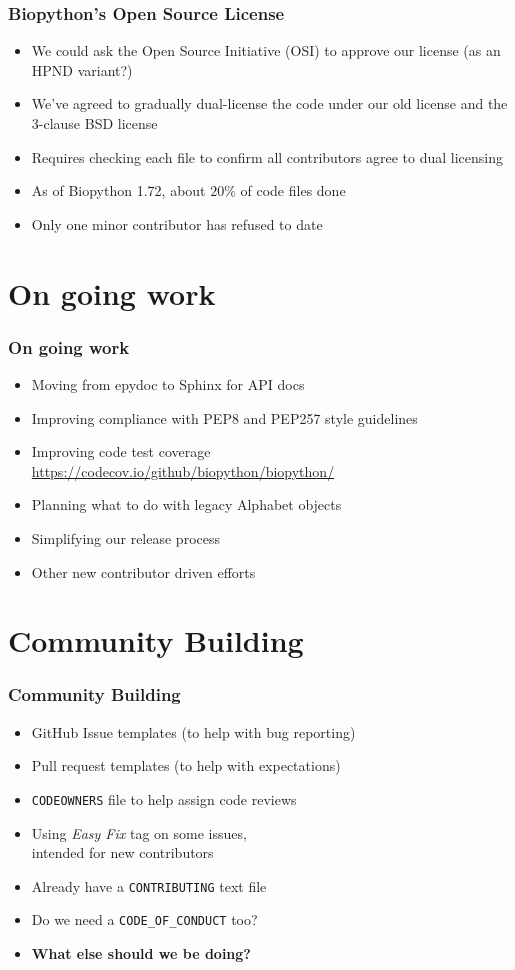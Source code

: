 \begin{frame}
\frametitle{Biopython's Open Source License}
\begin{itemize}
\item We could ask the Open Source Initiative (OSI)
    to approve our license (as an HPND variant?)
\item We've agreed to gradually dual-license the code
    under our old license and the 3-clause BSD license
\item Requires checking each file to confirm all
    contributors agree to dual licensing
\item As of Biopython 1.72, about $20\%$ of code files done
\item Only one minor contributor has refused to date
\end{itemize}
\end{frame}

\section{On going work}

\begin{frame}
\frametitle{On going work}
\begin{itemize}
    \item Moving from epydoc to Sphinx for API docs
    \item Improving compliance with PEP8 and PEP257 style guidelines
    \item Improving code test coverage \url{https://codecov.io/github/biopython/biopython/}
    \item Planning what to do with legacy Alphabet objects
    \item Simplifying our release process
    \item Other new contributor driven efforts
\end{itemize}
\end{frame}

\section{Community Building}

\begin{frame}
\frametitle{Community Building}
\begin{itemize}
   \item GitHub Issue templates (to help with bug reporting)
   \item Pull request templates (to help with expectations)
   \item \texttt{CODEOWNERS} file to help assign code reviews
   \item Using \textit{Easy Fix} tag on some issues, \\ intended for new contributors
   \item Already have a \texttt{CONTRIBUTING} text file
   \item Do we need a \texttt{CODE\_OF\_CONDUCT} too?
   \item \textbf{What else should we be doing?}
\end{itemize}
\end{frame}

